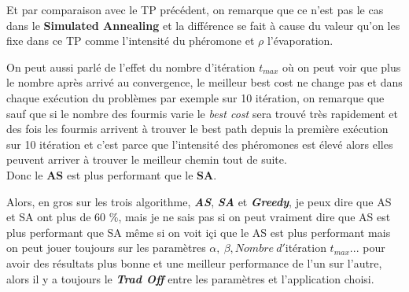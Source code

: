 Et par comparaison avec le TP précédent, on remarque que ce n'est pas le cas dans le \textbf{Simulated Annealing} et la différence se fait à cause du valeur qu'on les fixe dans ce TP comme l'intensité du phéromone et $ \rho $ l'évaporation.

On peut aussi parlé de l'effet du nombre d'itération $ t_{max} $ où on peut voir que plus le nombre après arrivé au convergence, le meilleur best cost ne change pas et dans chaque exécution du problèmes par exemple sur 10 itération, on remarque que sauf que si le nombre des fourmis varie le \textit{best cost} sera trouvé très rapidement et des fois les fourmis arrivent à trouver le best path depuis la première exécution sur 10 itération et c'est parce que l'intensité des phéromones est élevé alors elles peuvent arriver à trouver le meilleur chemin tout de suite.\\
Donc le \textbf{AS} est plus performant que le \textbf{SA}.


Alors, en gros sur les trois algorithme, \textit{\textbf{AS}}, \textit{\textbf{SA}} et \textit{\textbf{Greedy}}, je peux dire que AS et SA ont plus de 60 \%, mais je ne sais pas si on peut vraiment dire que AS est plus performant que SA même si on voit i\c{c}i que le AS est plus performant  mais on peut jouer toujours sur les paramètres $ \alpha,\ \beta, Nombre\ d'$itération $ t_{max} ...$  pour avoir des résultats plus bonne et une meilleur performance de l'un sur l'autre, alors il y a toujours le \textit{\textbf{Trad Off}} entre les paramètres et l'application choisi.
